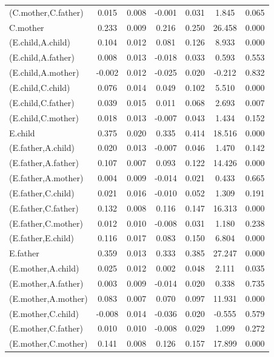 \documentclass[11pt,a5paper,twoside]{book}
\begin{document}
{{\begin{center}
\begin{longtable}{@{\extracolsep{\fill}}lcccccc@{}}
   (C.mother,C.father)  & 0.015 & 0.008 & -0.001 & 0.031 & 1.845 & 0.065 \\ 
   C.mother  & 0.233 & 0.009 & 0.216 & 0.250 & 26.458 & 0.000 \\ 
   (E.child,A.child)  & 0.104 & 0.012 & 0.081 & 0.126 & 8.933 & 0.000 \\ 
   (E.child,A.father)  & 0.008 & 0.013 & -0.018 & 0.033 & 0.593 & 0.553 \\ 
   (E.child,A.mother)  & -0.002 & 0.012 & -0.025 & 0.020 & -0.212 & 0.832 \\ 
   (E.child,C.child)  & 0.076 & 0.014 & 0.049 & 0.102 & 5.510 & 0.000 \\ 
   (E.child,C.father)  & 0.039 & 0.015 & 0.011 & 0.068 & 2.693 & 0.007 \\ 
   (E.child,C.mother)  & 0.018 & 0.013 & -0.007 & 0.043 & 1.434 & 0.152 \\ 
   E.child  & 0.375 & 0.020 & 0.335 & 0.414 & 18.516 & 0.000 \\ 
   (E.father,A.child)  & 0.020 & 0.013 & -0.007 & 0.046 & 1.470 & 0.142 \\ 
   (E.father,A.father)  & 0.107 & 0.007 & 0.093 & 0.122 & 14.426 & 0.000 \\ 
   (E.father,A.mother)  & 0.004 & 0.009 & -0.014 & 0.021 & 0.433 & 0.665 \\ 
   (E.father,C.child)  & 0.021 & 0.016 & -0.010 & 0.052 & 1.309 & 0.191 \\ 
   (E.father,C.father)  & 0.132 & 0.008 & 0.116 & 0.147 & 16.313 & 0.000 \\ 
   (E.father,C.mother)  & 0.012 & 0.010 & -0.008 & 0.031 & 1.180 & 0.238 \\ 
   (E.father,E.child)  & 0.116 & 0.017 & 0.083 & 0.150 & 6.804 & 0.000 \\ 
   E.father  & 0.359 & 0.013 & 0.333 & 0.385 & 27.247 & 0.000 \\ 
   (E.mother,A.child)  & 0.025 & 0.012 & 0.002 & 0.048 & 2.111 & 0.035 \\ 
   (E.mother,A.father)  & 0.003 & 0.009 & -0.014 & 0.020 & 0.338 & 0.735 \\ 
   (E.mother,A.mother)  & 0.083 & 0.007 & 0.070 & 0.097 & 11.931 & 0.000 \\ 
   (E.mother,C.child)  & -0.008 & 0.014 & -0.036 & 0.020 & -0.555 & 0.579 \\ 
   (E.mother,C.father)  & 0.010 & 0.010 & -0.008 & 0.029 & 1.099 & 0.272 \\ 
   (E.mother,C.mother)  & 0.141 & 0.008 & 0.126 & 0.157 & 17.899 & 0.000 \\ 

\end{longtable}
\end{center}}}
\end{document}
